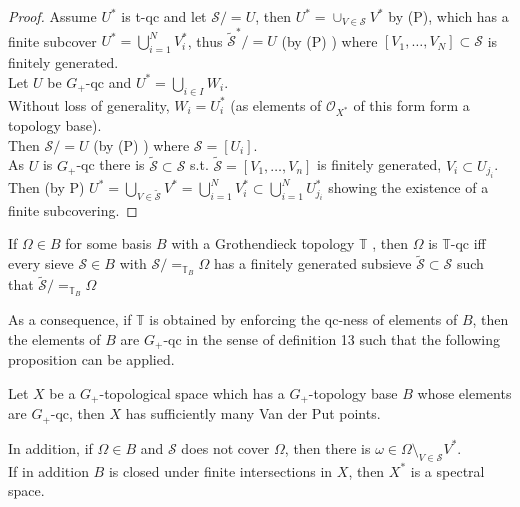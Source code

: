 \documentclass[../main.tex]{subfiles}
\begin{document}
\begin{proof}
	Assume $U^{\ast}$ is t-qc and let $ \mathcal{S}/= U$, then $U^{\ast}= \cup_{V\in \mathcal{S}} V^{\ast}$ by (P), which has a finite subcover $U^{\ast}= \bigcup_{i=1}^{N}V_i^{\ast}$, thus $\tilde{\mathcal{S}}^{\ast}/= U$ (by (P) ) where $[V_1,\ldots, V_N] \subset \mathcal{S}$ is finitely generated.\\
	Let $U$ be $G_+$-qc and $U^{\ast}= \bigcup_{i \in I} W_i$.\\
	Without loss of generality, $W_i = U_i^{\ast}$ (as elements of $ \mathcal{O}_{X^{\ast}} $ of this form form a topology base).\\
	Then $ \mathcal{S}/= U$ (by (P) ) where $ \mathcal{S}= [ U_i] $.\\
	As $U$ is $G_+$-qc there is $ \tilde{  \mathcal{S}  }\subset \mathcal{S}$ s.t. $ \tilde{ \mathcal{S} } = [ V_1,\ldots, V_n] $ is finitely generated, $V_i \subset U_{j_i} $.\\
	Then (by P) $U^{\ast}= \bigcup_{V\in \tilde{  \mathcal{S} }} V^{\ast} = \bigcup_{i=1}^{N}V_i^{\ast}\subset \bigcup_{i=1} ^{N}U_{j_i} ^{\ast}$ showing the existence of a finite subcovering.
\end{proof}
\begin{rmq}
If $\Omega\in B$ for some basis $B$ with a Grothendieck topology $ \mathbb{T}$ , then $\Omega$ is $ \mathbb{T}$-qc iff every sieve $ \mathcal{S}\in B$ with $\mathcal{S}/=_{ \mathbb{T}_B} \Omega$ has a finitely generated subsieve $ \tilde{ \mathcal{S} } \subset \mathcal{S}$ such that $ \tilde { \mathcal{S}} /=_{\mathbb{T}_B} \Omega$ 
\end{rmq}
\begin{rmq}
As a consequence, if $ \mathbb{T}$ is obtained by enforcing the qc-ness of elements of $B$, then the elements of $B$ are $G_+$-qc in the sense of definition 13 such that the following proposition can be applied.
\end{rmq}
\begin{propo}
Let $X$ be a $G_+$-topological space which has  a $G_+$-topology base $B$ whose elements are $G_+$-qc, then $X$ has sufficiently many Van der Put points.
\end{propo}
\begin{rmq}
In addition, if $\Omega\in B$ and $ \mathcal{S}$ does not cover $\Omega$, then there is $\omega\in \Omega \setminus_{V \in \mathcal{S}} V^{\ast}$.\\
If in addition $B$ is closed under finite intersections in $X$, then $X^{\ast}$ is a spectral space.
\end{rmq}
\end{document}
